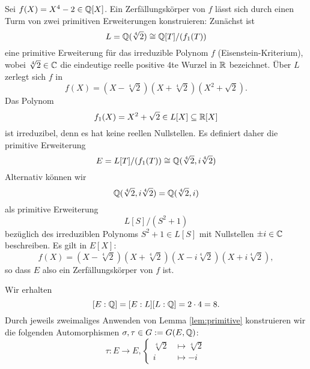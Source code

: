 \documentclass{book}
\begin{document}
\begin{exa}
    \label{exa:x42}
    Sei $f(X) = X^4 - 2 \in \mathbb{Q}[X]$. Ein Zerfällungskörper von $f$ lässt sich
    durch einen Turm von zwei primitiven Erweiterungen konstruieren: Zunächst
    ist 
    \[
        L = \mathbb{Q}(\sqrt[4]{2}) \cong \mathbb{Q}[T]/(f_1(T))
    \]
    eine primitive Erweiterung für das irreduzible Polynom $f$
    (Eisenstein-Kriterium), wobei $\sqrt[4]{2} \in \mathbb{C}$ die eindeutige reelle
    positive $4$te Wurzel in $\mathbb{R}$ bezeichnet. Über $L$ zerlegt sich $f$ in 
    \[
        f(X) = (X - \sqrt[4]{2})(X + \sqrt[4]{2}) (X^{2} + \sqrt{2}).
    \]
    Das Polynom 
    \[
        f_1(X) = X^{2} + \sqrt{2} \in L[X] \subseteq \mathbb{R}[X]
    \]
    ist irreduzibel, denn es hat keine reellen Nullstellen. Es definiert daher die primitive Erweiterung
    \[
        E = L[T]/(f_1(T)) \cong \mathbb{Q}(\sqrt[4]{2}, i\sqrt[4]{2})
    \]
    Alternativ können wir 
    \[
        \mathbb{Q}(\sqrt[4]{2}, i\sqrt[4]{2}) = \mathbb{Q}(\sqrt[4]{2}, i)
    \]
    als primitive Erweiterung 
    \[
        L[S]/(S^2 + 1) 
    \]
    bezüglich des irreduziblen Polynoms $S^2 + 1 \in L[S]$ mit
    Nullstellen $\pm i \in \mathbb{C}$ beschreiben. Es gilt in $E[X]$:
    \[
        f(X) = (X - \sqrt[4]{2})(X + \sqrt[4]{2}) (X - i\sqrt[4]{2})(X + i\sqrt[4]{2}),
    \]
    so dass $E$ also ein Zerfällungskörper von $f$ ist. 

    Wir erhalten 
    \[
        [E: \mathbb{Q}] = [E: L][L:\mathbb{Q}] = 2 \cdot 4 = 8.
    \]
    Durch jeweils zweimaliges Anwenden von Lemma \ref{lem:primitive}
    konstruieren wir die folgenden Automorphismen
    $\sigma,\tau \in G := G(E, \mathbb{Q})$:
    \[
        \tau: E \to E, \begin{cases} \sqrt[4]{2} & \mapsto \sqrt[4]{2}\\ i & \mapsto -i \end{cases}
    \]


\end{exa}
\end{document}
